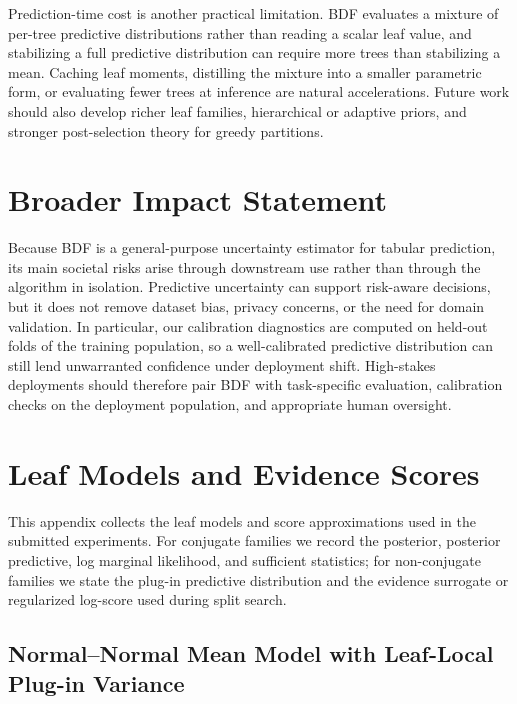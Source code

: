 \documentclass[10pt]{article} %
\begin{document}
Prediction-time cost is another practical limitation. BDF evaluates a mixture of per-tree predictive distributions rather than reading a scalar leaf value, and stabilizing a full predictive distribution can require more trees than stabilizing a mean. Caching leaf moments, distilling the mixture into a smaller parametric form, or evaluating fewer trees at inference are natural accelerations. Future work should also develop richer leaf families, hierarchical or adaptive priors, and stronger post-selection theory for greedy partitions.

\section*{Broader Impact Statement}

Because BDF is a general-purpose uncertainty estimator for tabular prediction, its main societal risks arise through downstream use rather than through the algorithm in isolation. Predictive uncertainty can support risk-aware decisions, but it does not remove dataset bias, privacy concerns, or the need for domain validation. In particular, our calibration diagnostics are computed on held-out folds of the training population, so a well-calibrated predictive distribution can still lend unwarranted confidence under deployment shift. High-stakes deployments should therefore pair BDF with task-specific evaluation, calibration checks on the deployment population, and appropriate human oversight.

\newpage



\newpage

\appendix

\section{Leaf Models and Evidence Scores}\label{app:leaf-models}\label{app:conjugate_updates}

This appendix collects the leaf models and score approximations used in the submitted experiments. For conjugate families we record the posterior, posterior predictive, log marginal likelihood, and sufficient statistics; for non-conjugate families we state the plug-in predictive distribution and the evidence surrogate or regularized log-score used during split search.

\subsection{Normal--Normal Mean Model with Leaf-Local Plug-in Variance}\label{app:conjugate_normal}
\end{document}
